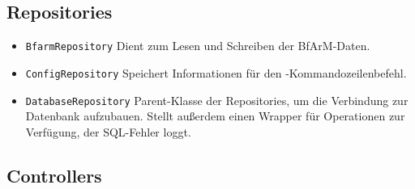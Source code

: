 \subsection{Repositories}

\begin{itemize}
\item \texttt{BfarmRepository} \newline Dient zum Lesen und Schreiben der BfArM-Daten.
\item \texttt{ConfigRepository} \newline Speichert Informationen für den \bfarmer-Kommandozeilenbefehl. 
\item \texttt{DatabaseRepository} \newline Parent-Klasse der Repositories, um die Verbindung zur Datenbank aufzubauen. Stellt außerdem einen Wrapper für Operationen zur Verfügung, der SQL-Fehler loggt. 
\end{itemize}

\subsection{Controllers}

